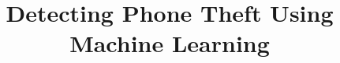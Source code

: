 \documentclass{soups}
\begin{document}
%

\title{Detecting Phone Theft Using Machine Learning}
%
%
%
%
%
\end{document}
